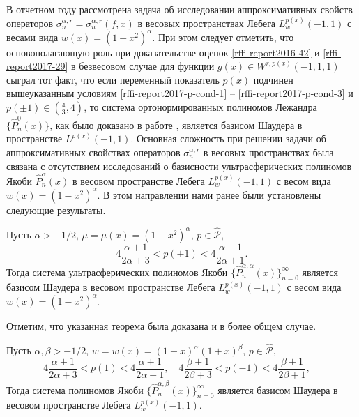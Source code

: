 В отчетном году рассмотрена задача об исследовании аппроксимативных свойств операторов
$\sigma_{n}^{\alpha,r}=\sigma_{n}^{\alpha,r}(f,x)$ в весовых пространствах Лебега $L^{p(x)}_w(-1,1)$ с весами вида $w(x)=(1-x^2)^\alpha$.  При этом следует отметить, что основополагающую роль при доказательстве оценок \eqref{rffi-report2016-42} и \eqref{rffi-report2017-29} в безвесовом случае для функции $g(x)\in W^{r,p(x)}(-1,1,1)$ сыграл тот факт, что если переменный показатель $p(x)$ подчинен вышеуказанным условиям \ref{rffi-report2017-p-cond-1} -- \ref{rffi-report2017-p-cond-3} и $p(\pm1)\in (\frac43,4)$, то система ортонормированных полиномов Лежандра $\{\hat{P}_n^{0}(x)\}$, как было доказано в работе \cite{rffi-report2016-shar31},  является базисом Шаудера в пространстве $L^{p(x)}(-1,1)$. Основная сложность при решении задачи об аппроксимативных свойствах операторов $\sigma_{n}^{\alpha,r}$ в весовых пространствах была связана с отсутствием исследований о базисности ультрасферических полиномов Якоби $\hat{P}^{\alpha}_n(x)$ в весовом пространстве Лебега $L^{p(x)}_w(-1,1)$ с весом вида $w(x)=(1-x^2)^\alpha$.
В этом направлении нами ранее были установлены следующие результаты.

\begin{theorem}\label{rffi-report2017-jacobi-weighted-basis}
Пусть $\alpha>-1/2$, $\mu=\mu(x)=(1-x^2)^\alpha$, $p\in\mathcal{ \hat P}$,
$$4\frac{\alpha+1}{2\alpha+3}<p(\pm1)<4\frac{\alpha+1}{2\alpha+1}.$$
Тогда система ультрасферических полиномов Якоби $\{\hat{P}^{\alpha,\alpha}_n(x)\}_{n=0}^\infty$ является базисом Шаудера в весовом пространстве Лебега $L^{p(x)}_w(-1,1)$ с весом вида $w(x)=(1-x^2)^\alpha$.
\end{theorem}

Отметим, что указанная теорема была доказана и в более общем случае.
\begin{theorem}
	Пусть $\alpha,\beta>-1/2$, $w=w(x)=(1-x)^\alpha(1+x)^\beta$, $p\in\mathcal{\hat P}$,
	$$
	4\frac{\alpha+1}{2\alpha+3}<p(1)<4\frac{\alpha+1}{2\alpha+1},\quad
	4\frac{\beta+1}{2\beta+3}<p(-1)<4\frac{\beta+1}{2\beta+1},\quad
	$$
	Тогда система полиномов Якоби $\{\hat{P}^{\alpha,\beta}_n(x)\}_{n=0}^\infty$ является базисом Шаудера в весовом пространстве Лебега $L^{p(x)}_w(-1,1)$.
\end{theorem}

